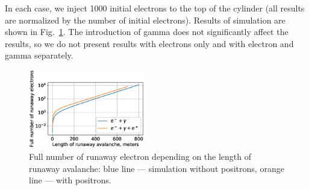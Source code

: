 \documentclass[doublecol,linenumbers]{epl2} %
\begin{document}
    In each case, we inject 1000 initial electrons to the top of the cylinder (all results are normalized by the number of initial electrons). Results of simulation are shown in Fig.~\ref{fig:sim}. The introduction of gamma does not significantly affect the results, so we do not present results with electrons only and with electron and gamma separately.
    
    \begin{figure}[h]
        \centering
        \includegraphics[width=0.45\textwidth]{figures/simulation.eps}
        \caption{Full number of runaway electron depending on the length of runaway avalanche: blue line --- simulation without positrons, orange line --- with positrons.}
        \label{fig:sim}
    \end{figure}
    
\end{document}
